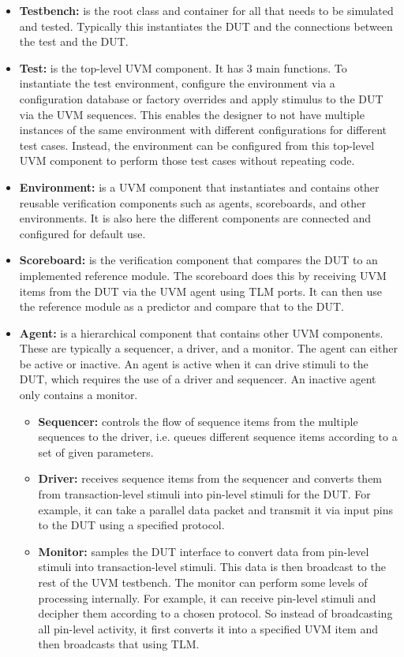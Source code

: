 \begin{itemize}
    \item \textbf{Testbench:} is the root class and container for all that needs to be simulated and tested. Typically this instantiates the DUT and the connections between the test and the DUT.
    \item \textbf{Test:} is the top-level UVM component. It has 3 main functions. To instantiate the test environment, configure the environment via a configuration database or factory overrides and apply stimulus to the DUT via the UVM sequences. This enables the designer to not have multiple instances of the same environment with different configurations for different test cases. Instead, the environment can be configured from this top-level UVM component to perform those test cases without repeating code.
    \item \textbf{Environment:} is a UVM component that instantiates and contains other reusable verification components such as agents, scoreboards, and other environments. It is also here the different components are connected and configured for default use. 
    \item \textbf{Scoreboard:} is the verification component that compares the DUT to an implemented reference module. The scoreboard does this by receiving UVM items from the DUT via the UVM agent using TLM ports. It can then use the reference module as a predictor and compare that to the DUT. 
    \item \textbf{Agent:} is a hierarchical component that contains other UVM components. These are typically a sequencer, a driver, and a monitor. The agent can either be active or inactive. An agent is active when it can drive stimuli to the DUT, which requires the use of a driver and sequencer. An inactive agent only contains a monitor.
    \begin{itemize}
        \item \textbf{Sequencer:} controls the flow of sequence items from the multiple sequences to the driver, i.e. queues different sequence items according to a set of given parameters.
        \item \textbf{Driver:} receives sequence items from the sequencer and converts them from transaction-level stimuli into pin-level stimuli for the DUT. For example, it can take a parallel data packet and transmit it via input pins to the DUT using a specified protocol. 
        \item \textbf{Monitor:} samples the DUT interface to convert data from pin-level stimuli into transaction-level stimuli. This data is then broadcast to the rest of the UVM testbench. The monitor can perform some levels of processing internally. For example, it can receive pin-level stimuli and decipher them according to a chosen protocol. So instead of broadcasting all pin-level activity, it first converts it into a specified UVM item and then broadcasts that using TLM.

\end{itemize}
\end{itemize}
